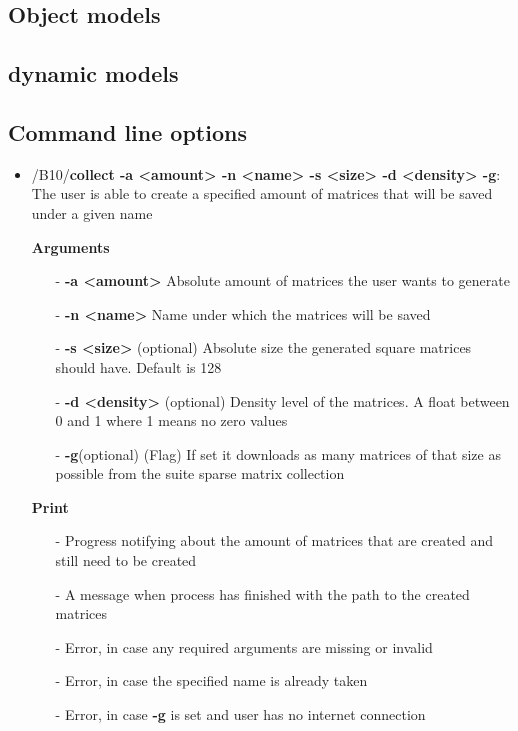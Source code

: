 \documentclass[parskip=full]{scrartcl}
\begin{document}
\subsection{Object models}
\subsection{dynamic models}

\subsection{Command line options}
\begin{itemize}
\item/B10/\textbf{collect -a <amount> -n <name> -s <size> -d <density> -g}:
\newline The user is able to create a specified amount of matrices that will be saved under a given name

\textbf{Arguments}
	\begin{itemize}
	\item[-]\textbf{-a <amount>} Absolute amount of matrices the user wants to generate
	\item[-]\textbf{-n <name>} Name under which the matrices will be saved
	\item[-]\textbf{-s <size>} (optional) Absolute size the generated square matrices should have. Default is 128
	\item[-]\textbf{-d <density>} (optional) Density level of the matrices. A float between 0 and 1 where 1 means no zero values
	\item[-]\textbf{-g}(optional) (Flag) If set it downloads as many matrices of that size as possible from the suite sparse matrix collection
	\end{itemize}

\textbf{Print}
	\begin{itemize}
	\item[-]Progress notifying about the amount of matrices that are created and still need to be created
	\item[-]A message when process has finished with the path to the created matrices
	\item[-]Error, in case any required arguments are missing or invalid
	\item[-]Error, in case the specified name is already taken
	\item[-]Error, in case \textbf{-g} is set and user has no internet connection
	\end{itemize}


\end{itemize}
\end{document}
